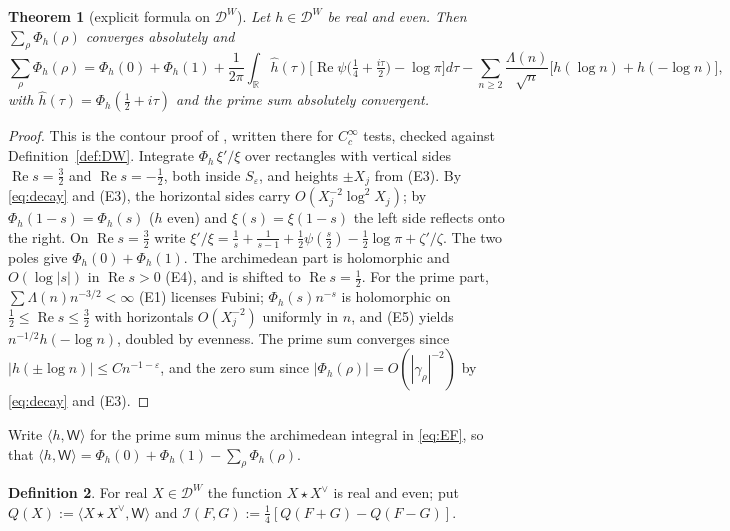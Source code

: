 \documentclass[11pt]{amsart}
\newtheorem{theorem}{Theorem}[section]
\theoremstyle{definition}
\newtheorem{definition}[theorem]{Definition}
\theoremstyle{remark}
\newcommand{\R}{\mathbb R}
\newcommand{\Rel}{\operatorname{Re}}
\newcommand{\DW}{\mathcal D^{W}}
\newcommand{\I}{\mathcal I}
\begin{document}
\begin{theorem}[explicit formula on $\DW$]\label{thm:EF}
Let $h\in\DW$ be real and even. Then $\sum_\rho\Phi_h(\rho)$ converges absolutely and
\begin{equation}\label{eq:EF}
\sum_\rho\Phi_h(\rho)=\Phi_h(0)+\Phi_h(1)+\frac1{2\pi}\int_\R\hat h(\tau)\Big[\Rel\psi\big(\tfrac14+\tfrac{i\tau}2\big)-\log\pi\Big]d\tau
-\sum_{n\ge2}\frac{\Lambda(n)}{\sqrt n}\big[h(\log n)+h(-\log n)\big],
\end{equation}
with $\hat h(\tau)=\Phi_h(\frac12+i\tau)$ and the prime sum absolutely convergent.
\end{theorem}
\begin{proof}
This is the contour proof of \cite[Thm.~3.3]{Paper45}, written there for $C_c^\infty$ tests, checked
against Definition~\ref{def:DW}. Integrate $\Phi_h\,\xi'/\xi$ over rectangles with vertical sides
$\Rel s=\frac32$ and $\Rel s=-\frac12$, both inside $S_\varepsilon$, and heights $\pm X_j$ from (E3).
By \eqref{eq:decay} and (E3), the horizontal sides carry $O(X_j^{-2}\log^2X_j)$; by $\Phi_h(1-s)=\Phi_h(s)$
($h$ even) and $\xi(s)=\xi(1-s)$ the left side reflects onto the right. On $\Rel s=\frac32$ write
$\xi'/\xi=\frac1s+\frac1{s-1}+\frac12\psi(\frac s2)-\frac12\log\pi+\zeta'/\zeta$. The two poles give
$\Phi_h(0)+\Phi_h(1)$. The archimedean part is holomorphic and $O(\log|s|)$ in $\Rel s>0$ (E4), and is
shifted to $\Rel s=\frac12$. For the prime part, $\sum\Lambda(n)n^{-3/2}<\infty$ (E1) licenses Fubini;
$\Phi_h(s)n^{-s}$ is holomorphic on $\frac12\le\Rel s\le\frac32$ with horizontals $O(X_j^{-2})$
uniformly in $n$, and (E5) yields $n^{-1/2}h(-\log n)$, doubled by evenness. The prime sum converges
since $|h(\pm\log n)|\le Cn^{-1-\varepsilon}$, and the zero sum since $|\Phi_h(\rho)|=O(|\gamma_\rho|^{-2})$
by \eqref{eq:decay} and (E3).
\end{proof}

Write $\langle h,\mathsf W\rangle$ for the prime sum minus the archimedean integral in
\eqref{eq:EF}, so that $\langle h,\mathsf W\rangle=\Phi_h(0)+\Phi_h(1)-\sum_\rho\Phi_h(\rho)$.

\begin{definition}\label{def:form}
For real $X\in\DW$ the function $X\star X^\vee$ is real and even; put $Q(X):=\langle X\star X^\vee,\mathsf W\rangle$ and
$\I(F,G):=\frac14[Q(F+G)-Q(F-G)]$.
\end{definition}
\end{document}
